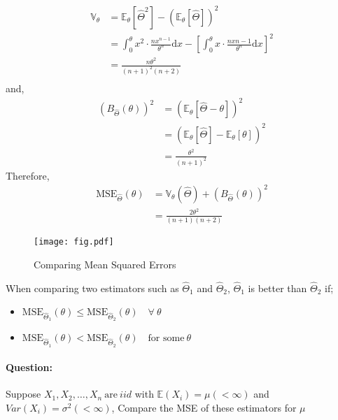 \documentclass[12pt,a4paper]{article}
\begin{document}
   \begin{align*}
    \mathbb{V}_{\theta}&=\mathbb{E}_{\theta}\left[ \hat{\Theta}^2 \right] - \left( \mathbb{E}_{\theta}\left[ \hat{\Theta} \right]    \right)^2 \\
    &= \int_{0}^{\theta} x^2 \cdot \frac{nx^{n-1}}{\theta^n}\mathrm{d}x
    - \left[\int_{0}^{\theta} x \cdot \frac{nx{n-1}}{\theta^n}\mathrm{d}x\right]^2 \\
    &= \frac{n\theta^2}{(n+1)^2(n+2)}\\
   \end{align*}
   and,
   \begin{align*}
    \left(B_{\hat{\Theta}}(\theta)\right)^2&= (\mathbb{E}_{\theta}[\hat{\Theta}-\theta])^2\\
    &= (\mathbb{E}_{\theta}[\hat{\Theta}]-\mathbb{E}_{\theta}[\theta])^2\\
    &= \frac{\theta^2}{(n+1)^2}
   \end{align*}
   Therefore,
   \begin{align*}
    \mathrm{MSE}_{\hat{\Theta}}(\theta)&= \mathbb{V}_{\theta}(\hat{\Theta})+ \left( B_{\hat{\Theta}}(\theta) \right)^2 \\
    &= \frac{2\theta^2}{(n+1)(n+2)}
   \end{align*}
   
   \begin{figure}[ht]
       \centering
       \texttt{[image: fig.pdf]}
       \caption{Comparing Mean Squared Errors}
       \label{Label}
   \end{figure}
    
   When comparing two estimators such as \(\hat{\Theta}_{1}\) and \(\hat{\Theta}_{2}\), \(\hat{\Theta}_{1}\) is better than \(\hat{\Theta}_{2}\) if;
   \begin{itemize}
    \item \(\mathrm{MSE}_{\hat{\Theta}_{1}}(\theta) \leq \mathrm{MSE}_{\hat{\Theta}_{2}}(\theta) \quad \forall \ \theta\)
    \item \(\mathrm{MSE}_{\hat{\Theta}_{1}}(\theta) < \mathrm{MSE}_{\hat{\Theta}_{2}}(\theta) \quad \text{for some} \ \theta\)    
   \end{itemize}        
    
   
   \paragraph{Question:}
    Suppose \(X_{1},X_{2},\ldots,X_{n} \  \text{are} \ iid \) with \(\mathbb{E}(X_{i})=\mu (< \infty)\) and \(Var(X_{i})=\sigma^2 (<\infty)\),
    Compare the MSE of these estimators for \(\mu\) 
\end{document}
